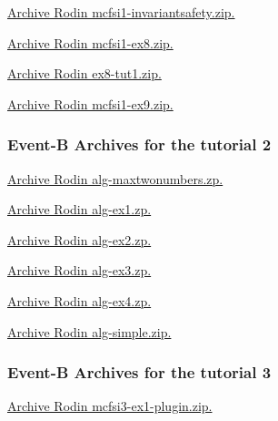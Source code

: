 \documentclass[ 12pt]{article}
\begin{document}
\href{http://mery54.github.io/teaching/mosos/models/mcfsi1-invariantsafety.zip}{Archive 
  Rodin   mcfsi1-invariantsafety.zip.}



\href{http://mery54.github.io/teaching/mosos/models/mcfsi1-ex8.zip}{Archive 
  Rodin   mcfsi1-ex8.zip.}

\href{http://mery54.github.io/teaching/mosos/models/mcfsi1-ex9.zip}{Archive 
  Rodin   ex8-tut1.zip.}



\href{http://mery54.github.io/teaching/mosos/models/mcfsi1-ex9.zip}{Archive 
  Rodin   mcfsi1-ex9.zip.}



 \subsubsection{Event-B Archives for   the tutorial 2}
\label{sec:event-b-archives}




\href{http://mery54.github.io/teaching/mosos/models/alg-maxtwonumbers.zip}{Archive 
  Rodin  alg-maxtwonumbers.zp.}





\href{http://mery54.github.io/teaching/mosos/models/alg-ex1.zip}{Archive 
  Rodin  alg-ex1.zp.}

\href{http://mery54.github.io/teaching/mosos/models/alg-ex2.zip}{Archive 
  Rodin  alg-ex2.zp.}

\href{http://mery54.github.io/teaching/mosos/models/alg-ex3.zip}{Archive 
  Rodin  alg-ex3.zp.}

\href{http://mery54.github.io/teaching/mosos/models/alg-ex4.zip}{Archive 
  Rodin  alg-ex4.zp.}




\href{http://mery54.github.io/teaching/mosos/models/alg-simple.zip}{Archive 
  Rodin  alg-simple.zip.}





 \subsubsection{Event-B Archives for   the tutorial 3}
\label{sec:event-b-archives}





\href{http://mery54.github.io/teaching/mosos/models/mcfsi3-ex1-plugin.zip}{Archive 
  Rodin  mcfsi3-ex1-plugin.zip.}
\end{document}
